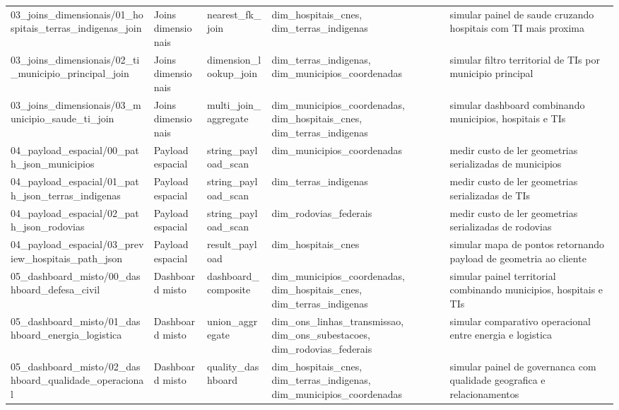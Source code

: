 \begin{landscape}
{\begin{longtable}{p{}p{}p{}p{}p{}}
03\_joins\_dimensionais/01\_hospitais\_terras\_indigenas\_join & Joins dimensionais & nearest\_fk\_join & dim\_hospitais\_cnes, dim\_terras\_indigenas & simular painel de saude cruzando hospitais com TI mais proxima \\
03\_joins\_dimensionais/02\_ti\_municipio\_principal\_join & Joins dimensionais & dimension\_lookup\_join & dim\_terras\_indigenas, dim\_municipios\_coordenadas & simular filtro territorial de TIs por municipio principal \\
03\_joins\_dimensionais/03\_municipio\_saude\_ti\_join & Joins dimensionais & multi\_join\_aggregate & dim\_municipios\_coordenadas, dim\_hospitais\_cnes, dim\_terras\_indigenas & simular dashboard combinando municipios, hospitais e TIs \\
04\_payload\_espacial/00\_path\_json\_municipios & Payload espacial & string\_payload\_scan & dim\_municipios\_coordenadas & medir custo de ler geometrias serializadas de municipios \\
04\_payload\_espacial/01\_path\_json\_terras\_indigenas & Payload espacial & string\_payload\_scan & dim\_terras\_indigenas & medir custo de ler geometrias serializadas de TIs \\
04\_payload\_espacial/02\_path\_json\_rodovias & Payload espacial & string\_payload\_scan & dim\_rodovias\_federais & medir custo de ler geometrias serializadas de rodovias \\
04\_payload\_espacial/03\_preview\_hospitais\_path\_json & Payload espacial & result\_payload & dim\_hospitais\_cnes & simular mapa de pontos retornando payload de geometria ao cliente \\
05\_dashboard\_misto/00\_dashboard\_defesa\_civil & Dashboard misto & dashboard\_composite & dim\_municipios\_coordenadas, dim\_hospitais\_cnes, dim\_terras\_indigenas & simular painel territorial combinando municipios, hospitais e TIs \\
05\_dashboard\_misto/01\_dashboard\_energia\_logistica & Dashboard misto & union\_aggregate & dim\_ons\_linhas\_transmissao, dim\_ons\_subestacoes, dim\_rodovias\_federais & simular comparativo operacional entre energia e logistica \\
05\_dashboard\_misto/02\_dashboard\_qualidade\_operacional & Dashboard misto & quality\_dashboard & dim\_hospitais\_cnes, dim\_terras\_indigenas, dim\_municipios\_coordenadas & simular painel de governanca com qualidade geografica e relacionamentos \\
\bottomrule
\end{longtable}
}
\end{landscape}
